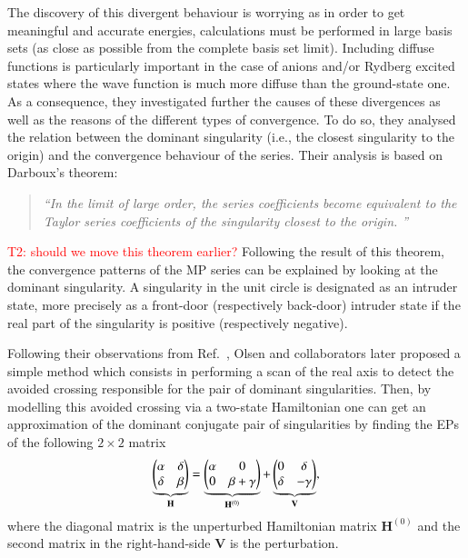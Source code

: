 \documentclass[aps,prb,reprint,noshowkeys,linenumbers,superscriptaddress]{revtex4-1}
\newcommand{\titou}[1]{\textcolor{red}{#1}}
\newcommand{\latin}[1]{#1}
\newcommand{\ie}{\latin{i.e.}}
\newcommand{\bH}{\mathbf{H}}
\newcommand{\bV}{\mathbf{V}}
\begin{document}
The discovery of this divergent behaviour is worrying as in order to get meaningful and accurate energies, calculations must be performed in large basis sets (as close as possible from the complete basis set limit). \cite{Loos_2019d,Giner_2019}
Including diffuse functions is particularly important in the case of anions and/or Rydberg excited states where the wave function is much more diffuse than the ground-state one. \cite{Loos_2018a,Loos_2020a}
As a consequence, they investigated further the causes of these divergences as well as the reasons of the different types of convergence. 
To do so, they analysed the relation between the dominant singularity (\ie, the closest singularity to the origin) and the convergence behaviour of the series. \cite{Olsen_2000} Their analysis is based on Darboux's theorem: \cite{Goodson_2011}
\begin{quote}
	\textit{``In the limit of large order, the series coefficients become equivalent to the Taylor series coefficients of the singularity closest to the origin. ''}
\end{quote}
\titou{T2: should we move this theorem earlier?}
Following the result of this theorem, the convergence patterns of the MP series can be explained by looking at the dominant singularity.
A singularity in the unit circle is designated as an intruder state, more precisely as a front-door (respectively back-door) intruder state if the real part of the singularity is positive (respectively negative). 

Following their observations from Ref.~, Olsen and collaborators later proposed a simple method which consists in performing a scan of the real axis to detect the avoided crossing responsible for the pair of dominant singularities. \cite{Olsen_2000} 
Then, by modelling this avoided crossing via a two-state Hamiltonian one can get an approximation of the dominant conjugate pair of singularities by finding the EPs of the following $2\times2$ matrix
\begin{equation}
	\label{eq:Olsen_2x2}
	\underbrace{\mqty(\alpha & \delta \\ \delta & \beta)}_{\bH} = \underbrace{\mqty(\alpha & 0 \\ 0 & \beta + \gamma )}_{\bH^{(0)}} + \underbrace{\mqty( 0 & \delta \\ \delta & - \gamma)}_{\bV},
\end{equation}
where the diagonal matrix is the unperturbed Hamiltonian matrix $\bH^{(0)}$ and the second matrix in the right-hand-side $\bV$ is the perturbation.
\end{document}
